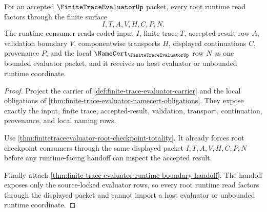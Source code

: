 \begin{theorem}
\label{thm:finitetraceevaluator-root-runtime-totality}
For an accepted $\FiniteTraceEvaluatorUp$ packet, every root runtime read factors through the finite surface
$$
I,T,A,V,H,C,P,N.
$$
The runtime consumer reads coded input $I$, finite trace $T$, accepted-result row $A$, validation boundary $V$, componentwise transports $H$, displayed continuations $C$, provenance $P$, and the local $\NameCert_{\FiniteTraceEvaluatorUp}$ row $N$ as one bounded evaluator packet, and it receives no host evaluator or unbounded runtime coordinate.
\end{theorem}
\begin{proof}
Project the carrier of \autoref{def:finite-trace-evaluator-carrier} and the local obligations of \autoref{thm:finite-trace-evaluator-namecert-obligations}. They expose exactly the input, finite trace, accepted-result, validation, transport, continuation, provenance, and local naming rows.

Use \autoref{thm:finitetraceevaluator-root-checkpoint-totality}. It already forces root checkpoint consumers through the same displayed packet $I,T,A,V,H,C,P,N$ before any runtime-facing handoff can inspect the accepted result.

Finally attach \autoref{thm:finite-trace-evaluator-runtime-boundary-handoff}. The handoff exposes only the source-locked evaluator rows, so every root runtime read factors through the displayed packet and cannot import a host evaluator or unbounded runtime coordinate.
\end{proof}


